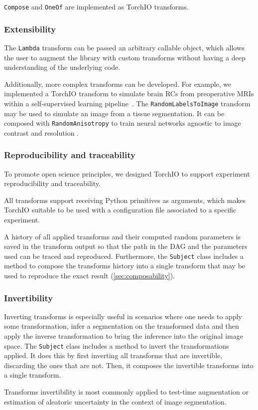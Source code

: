 \texttt{Compose} and \texttt{OneOf} are implemented as TorchIO
transforms.


\subsubsection{Extensibility}

The \texttt{Lambda} transform can be passed an arbitrary callable object, which allows the user to augment the library with custom transforms without having a deep understanding of the underlying code.

Additionally, more complex transforms can be developed.
For example, we implemented a TorchIO transform to simulate brain \acp{RC} from preoperative \acp{MRI} within a self-supervised learning pipeline~\cite{perez-garcia_simulation_2020}.
The \texttt{RandomLabelsToImage} transform may be used to simulate an image from a tissue segmentation.
It can be composed with \texttt{RandomAnisotropy} to train neural networks agnostic to image contrast and resolution \cite{billot_learning_2020, billot_partial_2020,iglesias_joint_2020}.


\subsubsection{Reproducibility and traceability}

To promote open science principles, we designed TorchIO to support experiment reproducibility and traceability.

All transforms support receiving Python primitives as arguments, which makes TorchIO suitable to be used with a configuration file associated to a specific experiment.

A history of all applied transforms and their computed random parameters is saved in the transform output so that the path in the \ac{DAG} and the parameters used can be traced and reproduced.
Furthermore, the \texttt{Subject} class includes a method to compose the transforms history into a single transform that may be used to reproduce the exact result (\cref{sec:composability}).


\subsubsection{Invertibility}

Inverting transforms is especially useful in scenarios where one needs to apply some transformation, infer a segmentation on the transformed data and then apply the inverse transformation to bring the inference into the original image space.
The \texttt{Subject} class includes a method to invert the transformations applied.
It does this by first inverting all transforms that are invertible, discarding the ones that are not.
Then, it composes the invertible transforms into a single transform.

Transforms invertibility is most commonly applied to test-time augmentation \cite{moshkov_test-time_2020} or estimation of aleatoric uncertainty \cite{wang_aleatoric_2019} in the context of image segmentation.
